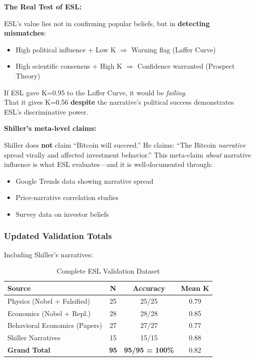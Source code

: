 \documentclass[11pt,a4paper]{article}
\begin{document}
\begin{resultbox}
\textbf{The Real Test of ESL:}

ESL's value lies not in confirming popular beliefs, but in \textbf{detecting mismatches}:
\begin{itemize}
    \item High political influence + Low K $\Rightarrow$ Warning flag (Laffer Curve)
    \item High scientific consensus + High K $\Rightarrow$ Confidence warranted (Prospect Theory)
\end{itemize}

If ESL gave K=0.95 to the Laffer Curve, it would be \textit{failing}. \\
That it gives K=0.56 \textbf{despite} the narrative's political success demonstrates ESL's discriminative power.
\end{resultbox}

\textbf{Shiller's meta-level claims:}

Shiller does \textbf{not} claim ``Bitcoin will succeed.'' He claims: ``The Bitcoin \textit{narrative} spread virally and affected investment behavior.'' This meta-claim \textit{about} narrative influence is what ESL evaluates---and it is well-documented through:
\begin{itemize}
    \item Google Trends data showing narrative spread
    \item Price-narrative correlation studies
    \item Survey data on investor beliefs
\end{itemize}

\subsubsection{Updated Validation Totals}

Including Shiller's narratives:

\begin{table}[h]
\centering
\caption{Complete ESL Validation Dataset}
\begin{tabular}{lccc}
\toprule
\textbf{Source} & \textbf{N} & \textbf{Accuracy} & \textbf{Mean K} \\
\midrule
Physics (Nobel + Falsified) & 25 & 25/25 & 0.79 \\
Economics (Nobel + Repl.) & 28 & 28/28 & 0.85 \\
Behavioral Economics (Papers) & 27 & 27/27 & 0.77 \\
Shiller Narratives & 15 & 15/15 & 0.88 \\
\midrule
\textbf{Grand Total} & \textbf{95} & \textbf{95/95 = 100\%} & 0.82 \\
\bottomrule
\end{tabular}
\end{table}
\end{document}
